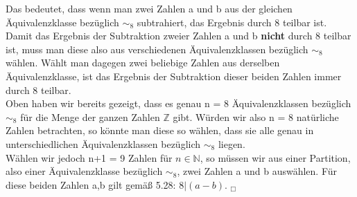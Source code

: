 \documentclass[11pt,a4paper]{article}
\begin{document}
Das bedeutet, dass wenn man zwei Zahlen a und b aus der gleichen Äquivalenzklasse bezüglich $\sim_8$ subtrahiert, das Ergebnis durch 8 teilbar ist. Damit das Ergebnis der Subtraktion zweier Zahlen a und b \textbf{nicht} durch 8 teilbar ist, muss man diese also aus verschiedenen Äquivalenzklassen bezüglich $\sim_8$ wählen. Wählt man dagegen zwei beliebige Zahlen aus derselben Äquivalenzklasse, ist das Ergebnis der Subtraktion dieser beiden Zahlen immer durch 8 teilbar. \\

Oben haben wir bereits gezeigt, dass es genau n = 8 Äquivalenzklassen bezüglich $\sim_8$ für die Menge der ganzen Zahlen $\mathbb{Z}$ gibt. Würden wir also n = 8 natürliche Zahlen betrachten, so könnte man diese so wählen, dass sie alle genau in unterschiedlichen Äquivalenzklassen bezüglich $\sim_8$ liegen. \\
Wählen wir jedoch n+1 = 9 Zahlen für $n \in \mathbb{N}$, so müssen wir aus einer Partition, also einer Äquivalenzklasse bezüglich $\sim_8$, zwei Zahlen a und b auswählen. Für diese beiden Zahlen a,b gilt gemäß 5.28: $8 | (a-b)$.    $_\Box$


\end{document}
